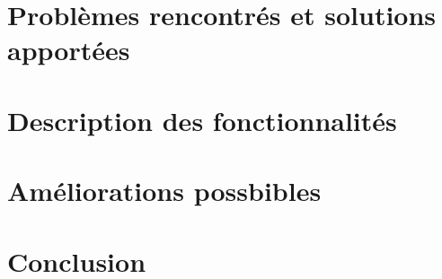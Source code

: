 \section{Problèmes rencontrés et solutions apportées}

\section{Description des fonctionnalités}

\section{Améliorations possbibles}

\section{Conclusion}
